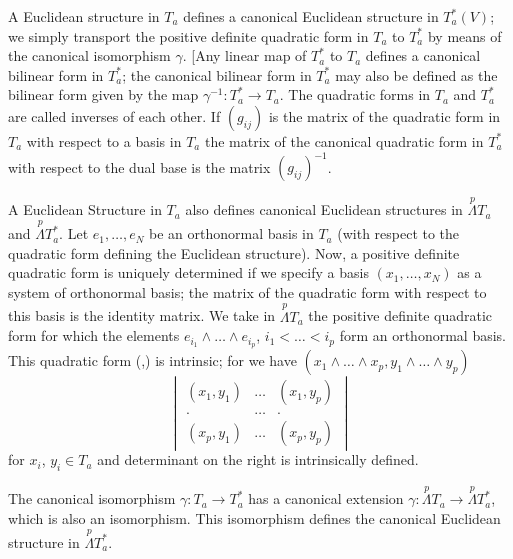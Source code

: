 A Euclidean structure in $T_{a}$ defines a canonical Euclidean
structure in $T^{\ast}_{a}(V)$; we simply transport the positive
definite quadratic form in $T_{a}$ to $T^{\ast}_{a}$ by means of the
canonical isomorphism $\gamma$. [Any linear map of $T^{\ast}_{a}$ to
  $T_{a}$ defines a canonical bilinear form in $T^{\ast}_{a}$; the
  canonical bilinear form in $T^{\ast}_{a}$ may also be defined as the
  bilinear form given by the map $\gamma^{-1}:T^{\ast}_{a}\to
  T_{a}$. The quadratic forms in $T_{a}$ and $T^{\ast}_{a}$ are called
  inverses of each other. If $(g_{ij})$ is the matrix of the quadratic
  form in $T_{a}$ with respect to a basis in $T_{a}$ the matrix of the
  canonical quadratic form in $T^{\ast}_{a}$ with respect to the dual
  base is the matrix $(g_{ij})^{-1}$.

A Euclidean Structure in $T_{a}$ also defines canonical Euclidean
structures in $\overset{p}{\Lambda}T_{a}$ and
$\overset{p}{\Lambda}T^{\ast}_{a}$. Let $e_{1},\ldots,e_{N}$ be an
orthonormal basis in $T_{a}$ (with respect to the quadratic form
defining the Euclidean structure). Now, a positive definite quadratic
form is uniquely determined if we specify a basis
$(x_{1},\ldots,x_{N})$ as a system of orthonormal basis; the matrix of
the quadratic form with respect to this basis is the identity
matrix. We take in $\overset{p}{\Lambda}T_{a}$ the positive definite
quadratic form for which the elements $e_{i_{1}}\wedge\ldots\wedge
e_{i_{p}}$, $i_{1}<\ldots<i_{p}$ form an orthonormal basis. This
quadratic form (\;,\;) is intrinsic; for we have
$(x_{1}\wedge\ldots\wedge x_{p},y_{1}\wedge\ldots\wedge
y_{p})$\pageoriginale
$$
\begin{vmatrix}
(x_{1},y_{1}) &\ldots & (x_{1},y_{p})\\
. & \ldots & .\\
(x_{p},y_{1}) & \ldots & (x_{p},y_{p})
\end{vmatrix}
$$
for $x_{i}$, $y_{i}\in T_{a}$ and determinant on the right is
intrinsically defined.

The canonical isomorphism $\gamma:T_{a}\to T^{\ast}_{a}$ has a
canonical extension $\gamma:\overset{p}{\Lambda}T_{a}\to
\overset{p}{\Lambda}T^{\ast}_{a}$, which is also an isomorphism. This
isomorphism defines the canonical Euclidean structure in
$\overset{p}{\Lambda}T^{\ast}_{a}$. 




